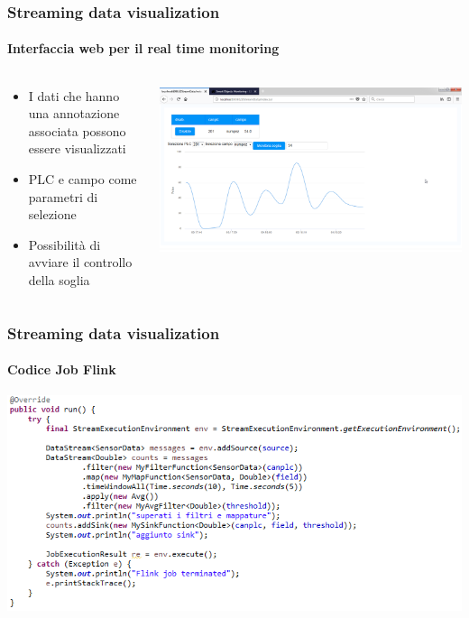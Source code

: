 \documentclass{beamer}
\begin{document}
\begin{frame}
\frametitle{Streaming data visualization}
\framesubtitle{Interfaccia web per il real time monitoring}
\begin{columns}[T] %
	\begin{column}{.3\textwidth}
		\begin{itemize}
			\small
			\item I dati che hanno una annotazione associata possono essere visualizzati
			\item PLC e campo come parametri di selezione
			\item Possibilità di avviare il controllo della soglia
		\end{itemize}
	\end{column}%
	\hfill%
	\begin{column}{.66\textwidth}
		\includegraphics[width=1\textwidth]{images/grafico-zk.png}
	\end{column}%
\end{columns}

\end{frame}

\begin{frame}
\frametitle{Streaming data visualization}
\framesubtitle{Codice Job Flink}
\includegraphics[width=1\textwidth]{images/flink-job.png}
\end{frame}
\end{document}
